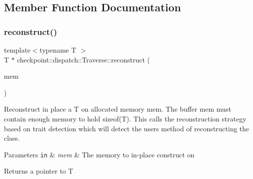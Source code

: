 \subsection{Member Function Documentation}
\mbox{\label{structcheckpoint_1_1dispatch_1_1_traverse_ad043c9e132aeb99049d0d3ff8df6b876}} 
\subsubsection{\texorpdfstring{reconstruct()}{reconstruct()}}
{\footnotesize\ttfamily template$<$typename T $>$ \\
T $\ast$ checkpoint\+::dispatch\+::\+Traverse\+::reconstruct (\begin{DoxyParamCaption}\item[{\hyperlink{namespacecheckpoint_ae57f01cdc0b81776c23b6c7c934c58f5}{Serial\+Byte\+Type} $\ast$}]{mem }\end{DoxyParamCaption})\hspace{0.3cm}{\ttfamily [static]}}



Reconstruct in place a {\ttfamily T} on allocated memory {\ttfamily mem}. The buffer {\ttfamily mem} must contain enough memory to hold {\ttfamily sizeof(\+T)}. This calls the reconstruction strategy based on trait detection which will detect the user\textquotesingle{}s method of reconstructing the class. 


\begin{DoxyParams}[1]{Parameters}
\mbox{\tt in}  & {\em mem} & The memory to in-\/place construct on\\
\hline
\end{DoxyParams}
\begin{DoxyReturn}{Returns}
a pointer to {\ttfamily T} 
\end{DoxyReturn}
\mbox{\label{structcheckpoint_1_1dispatch_1_1_traverse_a179ea8a80a3cf9a50091b70da785eb83}} 
